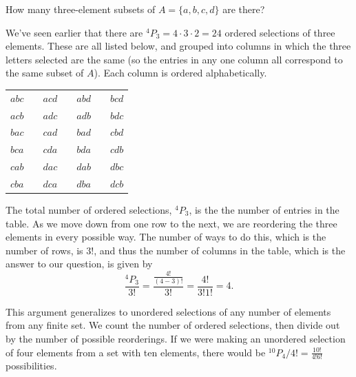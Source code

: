 \begin{example} How many three-element subsets of $A = \{a,b,c,d\}$ are there? 

We've seen earlier that there are $^{4}P_{3} = 4\cdot 3 \cdot 2 = 24$ ordered selections of three elements. These are all listed below, and grouped into columns in which the three letters selected are the same (so the entries in any one column all correspond to the same subset of $A$). Each column is ordered alphabetically.

\begin{center}
\begin{tabular}{ccccccc}
$abc$ & & $acd$ & & $abd$ & & $bcd$ \\
$acb$ & & $adc$ & & $adb$ & & $bdc$ \\
$bac$ & & $cad$ & & $bad$ & & $cbd$ \\
$bca$ & & $cda$ & & $bda$ & & $cdb$ \\
$cab$ & & $dac$ & & $dab$ & & $dbc$ \\
$cba$ & & $dca$ & & $dba$ & & $dcb$ \\
\end{tabular}
\end{center}

The total number of ordered selections, $^{4}P_{3}$, is the the number of entries in the table. As we move down from one row to the next, we are reordering the three elements in every possible way. The number of ways to do this, which is the number of rows, is $3!$, and thus the number of columns in the table, which is the answer to our question, is given by
$$\frac{^{4}P_{3}}{3!} = \frac{\frac{4!}{(4-3)!}}{3!} = \frac{4!}{3!1!} = 4.$$
\end{example}

This argument generalizes to unordered selections of any number of elements from any finite set. We count the number of ordered selections, then divide out by the number of possible reorderings. If we were making an unordered selection of four elements from a set with ten elements, there would be $^{10}P_{4} / 4! =  \frac{10!}{4!6!}$ possibilities.


